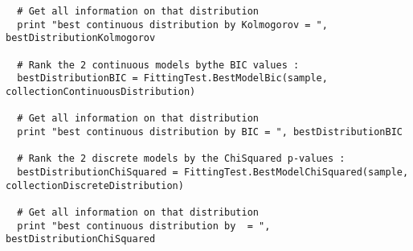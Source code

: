 \begin{lstlisting}
  # Get all information on that distribution
  print "best continuous distribution by Kolmogorov = ", bestDistributionKolmogorov

  # Rank the 2 continuous models bythe BIC values :
  bestDistributionBIC = FittingTest.BestModelBic(sample, collectionContinuousDistribution)

  # Get all information on that distribution
  print "best continuous distribution by BIC = ", bestDistributionBIC

  # Rank the 2 discrete models by the ChiSquared p-values :
  bestDistributionChiSquared = FittingTest.BestModelChiSquared(sample, collectionDiscreteDistribution)

  # Get all information on that distribution
  print "best continuous distribution by  = ", bestDistributionChiSquared
\end{lstlisting}

